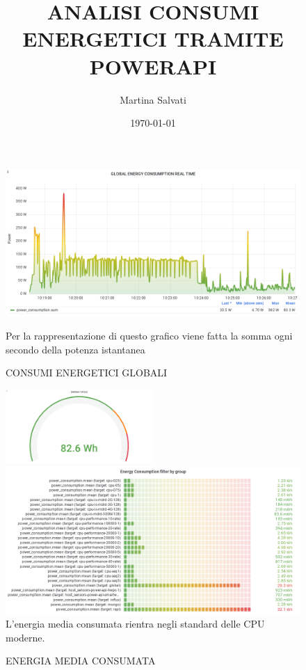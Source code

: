 \documentclass[10pt,a4paper]{article}
\author{Martina Salvati}
\title{ANALISI CONSUMI ENERGETICI TRAMITE POWERAPI}
\date{\today} %
\begin{document}
\maketitle
\listoffigures

\begin{figure}[h]
\caption{CONSUMI ENERGETICI GLOBALI}
\centering
\includegraphics[scale=0.4]{image2}
\begin{flushleft}
{Per la rappresentazione di questo grafico viene fatta la somma ogni secondo della potenza istantanea}
\end{flushleft}
\end{figure}
\begin{figure}[h]
\caption{ENERGIA MEDIA CONSUMATA}
\centering
\includegraphics[width=0.5\textwidth]{image43}
\includegraphics[scale=0.4]{image41}
{L'energia media consumata rientra negli standard delle CPU moderne.}
\end{figure}
\end{document}
